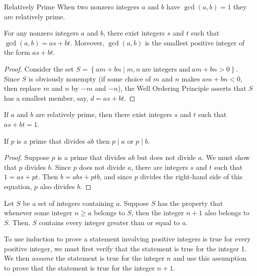\documentclass[../butidigress.tex]{subfiles}
\begin{document}
\begin{definition}{Relatively Prime}
When two nonzero integers $a$ and $b$ have $\gcd(a,b)=1$ they are relatively prime.
\end{definition}

\begin{theorem}
For any nonzero integers $a$ and $b$, there exist integers $s$ and $t$ such that $\gcd(a,b) = as+bt$.
Moreover, $\gcd(a, b)$ is the smallest positive integer of the form $as + bt$.
\end{theorem}

\begin{proof}
Consider the set $S = \left\{am + bn\mid m,n\ \text{are integers and}\ am + bn > 0 \right\}$.
Since $S$ is obviously nonempty (if some choice of $m$ and $n$ makes $am + bn < 0$, then replace $m$ and $n$ by $-m$ and $-n$), the Well Ordering Principle asserts that $S$ has a smallest member, say, $d = as + bt$.
\end{proof}

\begin{corollary}
If $a$ and $b$ are relatively prime, then there exist integers $s$ and $t$ such that $as+bt=1$.
\end{corollary}

\begin{lemma}
If $p$ is a prime that divides $ab$ then $p\mid a$ or $p\mid b$.
\end{lemma}

\begin{proof}
Suppose $p$ is a prime that divides $ab$ but does not divide $a$.
We must show that $p$ divides $b$.
Since $p$ does not divide $a$, there are integers $s$ and $t$ such that $1 = as + pt$.
Then $b = abs + ptb$, and since $p$ divides the right-hand side of this equation, $p$ also divides $b$.
\end{proof}


\begin{theorem}
Let $S$ be a set of integers containing $a$.
Suppose $S$ has the property that whenever some integer $n\geq a$ belongs to $S$, then the integer $n+1$ also belongs to $S$.
Then, $S$ contains every integer greater than or equal to $a$.
\end{theorem}

To use induction to prove a statement involving positive integers is true for every positive integer, we must first verify that the statement is true for the integer 1.
We then \emph{assume} the statement is true for the integer $n$ and use this assumption to prove that the statement is true for the integer $n+1$.
\end{document}
